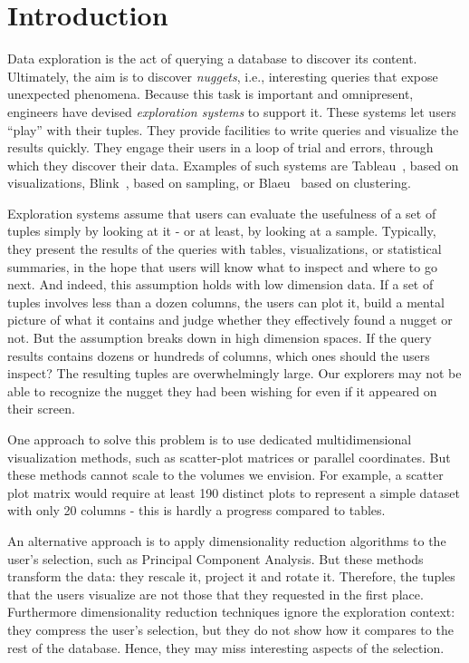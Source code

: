 \section{Introduction}
\label{sec:intro}

Data exploration is the act of querying a database to discover its content.
Ultimately, the aim is to discover \emph{nuggets}, i.e., interesting queries
that expose unexpected phenomena.  Because this task
is important and omnipresent, engineers have devised \emph{exploration
systems} to support it. These systems let users ``play'' with their tuples. They
provide facilities to write queries and visualize the results quickly.
They engage their users in a loop of trial and errors, through which they discover
their data. Examples of such systems are Tableau~\cite{StolteTangHanrahan2002},
based on visualizations, Blink~\cite{agarwal2012blink}, based on sampling, or
Blaeu~\cite{sellamTKDE} based on clustering.

Exploration systems assume that users can evaluate the usefulness of a set of
tuples simply by looking at it - or at least, by looking at a sample.
Typically, they present the results of the queries with tables, visualizations,
or statistical summaries, in the hope that users will know what to inspect and
where to go next. And indeed, this assumption holds with low dimension data.
If a set of tuples involves less than a dozen columns, the users can plot it,
build a mental picture of what it contains and judge whether they effectively
found a nugget or not. But the assumption breaks down in high dimension spaces.
If the query results contains dozens or hundreds of columns, which ones should the users
inspect? The resulting tuples are overwhelmingly large.  Our explorers may not be able to
recognize the nugget they had been wishing for even if it appeared on their
screen.  

One approach to solve this problem is to use dedicated multidimensional
visualization methods, such as scatter-plot matrices or parallel coordinates.
But these methods cannot scale to the volumes we envision. For example, a
scatter plot matrix would require at least 190 distinct plots to represent a
simple dataset with only 20 columns - this is hardly a progress compared to
tables.

An alternative approach is to apply dimensionality reduction algorithms to the
user's selection, such as Principal Component Analysis.  But these methods
transform the data: they rescale it, project it and rotate it.  Therefore, the
tuples that the users visualize are not those that they requested in the first
place.  Furthermore dimensionality reduction techniques ignore the exploration
context: they compress the user's selection, but they do not show how it
compares to the rest of the database. Hence, they may miss interesting
aspects of the selection.

